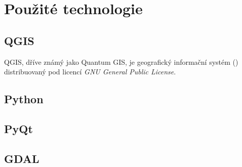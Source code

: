 \chapter{Použité technologie}
\label{3-technologie}

\section{QGIS}
\label{qgis}

QGIS, dříve známý jako Quantum GIS, je geografický informační systém () distribuovaný pod licencí \textit{GNU
General Public License}. 

\section{Python}
\label{python}



\section{PyQt}
\label{pyqt}



\section{GDAL}
\label{gdal}

